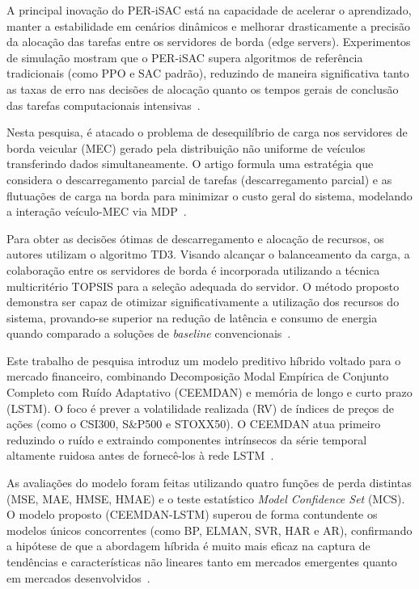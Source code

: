 A principal inovação do PER-iSAC está na capacidade de acelerar o aprendizado, manter a estabilidade em cenários dinâmicos e melhorar drasticamente a precisão da alocação das tarefas entre os servidores de borda (edge servers). Experimentos de simulação mostram que o PER-iSAC supera algoritmos de referência tradicionais (como \gls{PPO} e \gls{SAC} padrão), reduzindo de maneira significativa tanto as taxas de erro nas decisões de alocação quanto os tempos gerais de conclusão das tarefas computacionais intensivas~\cite{zou2025}.

Nesta pesquisa, é atacado o problema de desequilíbrio de carga nos servidores de borda veicular (\gls{MEC}) gerado pela distribuição não uniforme de veículos transferindo dados simultaneamente. O artigo formula uma estratégia que considera o descarregamento parcial de tarefas (descarregamento parcial) e as flutuações de carga na borda para minimizar o custo geral do sistema, modelando a interação veículo-\gls{MEC} via \gls{MDP}~\cite{wu2024}.

Para obter as decisões ótimas de descarregamento e alocação de recursos, os autores utilizam o algoritmo \gls{TD3}. Visando alcançar o balanceamento da carga, a colaboração entre os servidores de borda é incorporada utilizando a técnica multicritério \gls{TOPSIS} para a seleção adequada do servidor. O método proposto demonstra ser capaz de otimizar significativamente a utilização dos recursos do sistema, provando-se superior na redução de latência e consumo de energia quando comparado a soluções de \textit{baseline} convencionais~\cite{wu2024}.

Este trabalho de pesquisa introduz um modelo preditivo híbrido voltado para o mercado financeiro, combinando Decomposição Modal Empírica de Conjunto Completo com Ruído Adaptativo (CEEMDAN) e memória de longo e curto prazo (\gls{LSTM}). O foco é prever a volatilidade realizada (RV) de índices de preços de ações (como o CSI300, S\&P500 e STOXX50). O CEEMDAN atua primeiro reduzindo o ruído e extraindo componentes intrínsecos da série temporal altamente ruidosa antes de fornecê-los à rede \gls{LSTM}~\cite{lin2022}.

As avaliações do modelo foram feitas utilizando quatro funções de perda distintas (MSE, MAE, HMSE, HMAE) e o teste estatístico \textit{Model Confidence Set} (MCS). O modelo proposto (CEEMDAN-LSTM) superou de forma contundente os modelos únicos concorrentes (como BP, ELMAN, SVR, HAR e \gls{AR}), confirmando a hipótese de que a abordagem híbrida é muito mais eficaz na captura de tendências e características não lineares tanto em mercados emergentes quanto em mercados desenvolvidos~\cite{lin2022}.

